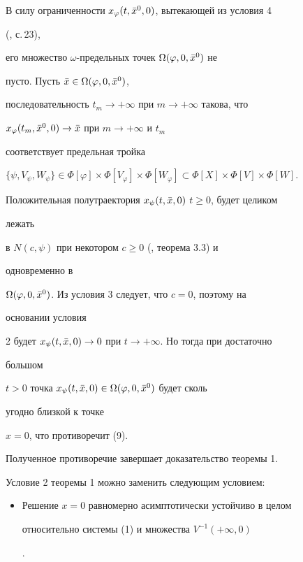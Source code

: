  


В силу ограниченности $x_\varphi(t,\Bar x^0,0)$, вытекающей из условия 4 


(\cite{She}, с.\,23), 


его множество $\omega$-предельных точек $\Omega(\varphi,0,\Bar x^0)$ не 


пусто. Пусть $\Bar x\in\Omega(\varphi,0,\Bar x^0)$, 


последовательность $t_m\to+\infty$ при $m\to+\infty$ такова, что 


$x_\varphi(t_m,\Bar x^0,0)\to\Bar x$ при $m\to+\infty$ и $t_m$ 


соответствует предельная тройка 


$\{\psi,V_\psi,W_\psi\}\in\Phi[\varphi]\times\Phi[V_\varphi] 


\times\Phi[W_\varphi]\subset\Phi[X]\times\Phi[V]\times\Phi[W]$. 


 


Положительная полутраектория $x_\psi(t,\Bar x,0)$ $t\ge 0$, будет целиком 


лежать 


в $N(c,\psi)$ при некотором $c\ge 0$ (\cite{And}, теорема 3.3) и 


одновременно в 


$\Omega(\varphi,0,\Bar x^0)$. Из условия 3 следует, что $c=0$, поэтому на 


основании условия 


2 будет $x_\psi(t,\Bar x,0)\to 0$ при $t\to+\infty$. Но тогда при достаточно 


большом 


$t>0$ точка $x_\psi(t,\Bar x,0)\in\Omega(\varphi,0,\Bar x^0)$ будет сколь 


угодно близкой к точке 


$x=0$, что противоречит (9). 


Полученное противоречие завершает доказательство теоремы 1. 


 




\begin{note} Условие 2 теоремы 1 можно заменить следующим условием: 


\begin{itemize} 


\item[2а.] Решение $x=0$ равномерно асимптотически устойчиво в целом 


относительно системы (1) и множества $V^{-1}(+\infty,0)$ 


\cite{Kos2}. 


\end{itemize}


\end{note} 


